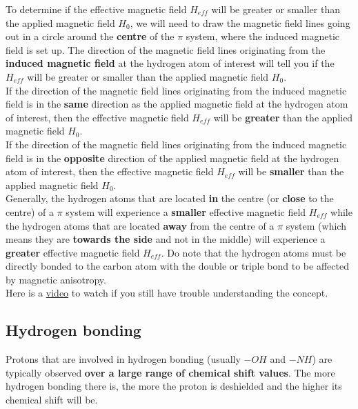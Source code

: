 \documentclass[11pt]{article}
\begin{document}
To determine if the effective magnetic field \(H_{eff}\) will be greater or smaller than the applied magnetic field \(H_{0}\), we will need to draw the magnetic field lines going out in a circle around the \textbf{centre} of the \(\pi\) system, where the induced magnetic field is set up. The direction of the magnetic field lines originating from the \textbf{induced magnetic field} at the hydrogen atom of interest will tell you if the \(H_{eff}\) will be greater or smaller than the applied magnetic field \(H_{0}\).
\\[0pt]

If the direction of the magnetic field lines originating from the induced magnetic field is in the \textbf{same} direction as the applied magnetic field at the hydrogen atom of interest, then the effective magnetic field \(H_{eff}\) will be \textbf{greater} than the applied magnetic field \(H_{0}\).
\\[0pt]

If the direction of the magnetic field lines originating from the induced magnetic field is in the \textbf{opposite} direction of the applied magnetic field at the hydrogen atom of interest, then the effective magnetic field \(H_{eff}\) will be \textbf{smaller} than the applied magnetic field \(H_{0}\).
\\[0pt]

Generally, the hydrogen atoms that are located \textbf{in} the centre (or \textbf{close} to the centre) of a \(\pi\) system will experience a \textbf{smaller} effective magnetic field \(H_{eff}\) while the hydrogen atoms that are located \textbf{away} from the centre of a \(\pi\) system (which means they are \textbf{towards the side} and not in the middle) will experience a \textbf{greater} effective magnetic field \(H_{eff}\). Do note that the hydrogen atoms must be directly bonded to the carbon atom with the double or triple bond to be affected by magnetic anisotropy.
\\[0pt]

Here is a \href{https://youtu.be/w8ew5bvdrqg}{video} to watch if you still have trouble understanding the concept.

\newpage

\subsection{Hydrogen bonding}
\label{sec:org7f081d8}
Protons that are involved in hydrogen bonding (usually \(-OH\) and \(-NH\)) are typically observed \textbf{over a large range of chemical shift values}. The more hydrogen bonding there is, the more the proton is deshielded and the higher its chemical shift will be.
\end{document}
